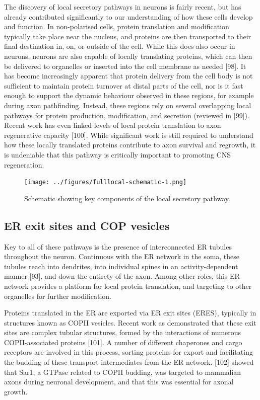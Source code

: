 \documentclass[
  12pt,
  a4paper,
]{book}
\begin{document}
The discovery of local secretory pathways in neurons is fairly recent, but has already contributed significantly to our understanding of how these cells develop and function. In non-polarised cells, protein translation and modification typically take place near the nucleus, and proteins are then transported to their final destination in, on, or outside of the cell. While this does also occur in neurons, neurons are also capable of locally translating proteins, which can then be delivered to organelles or inserted into the cell membrane as needed {[}98{]}. It has become increasingly apparent that protein delivery from the cell body is not sufficient to maintain protein turnover at distal parts of the cell, nor is it fast enough to support the dynamic behaviour observed in these regions, for example during axon pathfinding. Instead, these regions rely on several overlapping local pathways for protein production, modification, and secretion (reviewed in {[}99{]}). Recent work has even linked levels of local protein translation to axon regenerative capacity {[}100{]}. While significant work is still required to understand how these locally translated proteins contribute to axon survival and regrowth, it is undeniable that this pathway is critically important to promoting CNS regeneration.

\begin{figure}
\centering
\texttt{[image: ../figures/fulllocal-schematic-1.png]}
\caption{\label{fig:local-schematic}Schematic showing key components of the local secretory pathway.}
\end{figure}

\hypertarget{er-exit-sites-and-cop-vesicles}{%
\subsection{ER exit sites and COP vesicles}\label{er-exit-sites-and-cop-vesicles}}

Key to all of these pathways is the presence of interconnected ER tubules throughout the neuron. Continuous with the ER network in the soma, these tubules reach into dendrites, into individual spines in an activity-dependent manner {[}93{]}, and down the entirety of the axon. Among other roles, this ER network provides a platform for local protein translation, and targeting to other organelles for further modification.

Proteins translated in the ER are exported via ER exit sites (ERES), typically in structures known as COPII vesicles. Recent work as demonstrated that these exit sites are complex tubular structures, formed by the interactions of numerous COPII-associated proteins {[}101{]}. A number of different chaperones and cargo receptors are involved in this process, sorting proteins for export and facilitating the budding of these transport intermediates from the ER network. {[}102{]} showed that Sar1, a GTPase related to COPII budding, was targeted to mammalian axons during neuronal development, and that this was essential for axonal growth.
\end{document}
